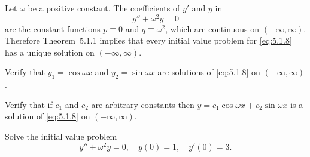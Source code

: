\setcounter{example}{1}
\setcounter{equation}{7}
\begin{example}
  \label{example:5.1.2} \rm %
  Let $\omega$ be a positive constant. The coefficients of $y'$ and $y$ in
  \begin{equation}
    \label{eq:5.1.8}y''+\omega^{2}y=0
  \end{equation}
  are the constant functions $p\equiv0$ and $q\equiv\omega^{2}$, which are continuous on
  $(-\infty,\infty)$. Therefore Theorem~5.1.1 implies that every initial value problem
  for \eqref{eq:5.1.8} has a unique solution on $(-\infty,\infty)$.
  \begin{alist}
    \item %
    Verify that $y_{1}=\cos\omega x$ and $y_{2}=\sin\omega x$ are solutions of \eqref{eq:5.1.8} on
    $(-\infty,\infty)$.

    \item %
    Verify that if $c_{1}$ and $c_{2}$ are arbitrary constants then
    $y=c_{1}\cos\omega x+c_{2}\sin\omega x$ is a solution of \eqref{eq:5.1.8} on $(-\infty,\infty)$.

    \item %
    Solve the initial value problem
    \begin{equation}
      \label{eq:5.1.9}y''+\omega^{2}y=0,\quad y(0)=1,\quad y'(0)=3.
    \end{equation}
  \end{alist}
\end{example}
\setcounter{equation}{9}
